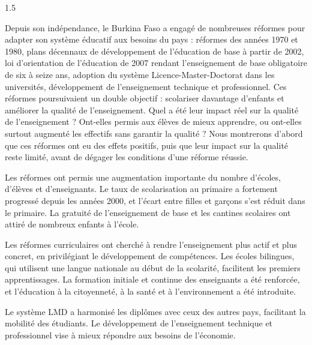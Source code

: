 \documentclass[12pt]{article}
\begin{document}
\begin{spacing}{1.5}


Depuis son indépendance, le Burkina Faso a engagé de nombreuses réformes pour adapter son système éducatif aux besoins du pays : réformes des années 1970 et 1980, plans décennaux de développement de l'éducation de base à partir de 2002, loi d'orientation de l'éducation de 2007 rendant l'enseignement de base obligatoire de six à seize ans, adoption du système Licence-Master-Doctorat dans les universités, développement de l'enseignement technique et professionnel. Ces réformes poursuivaient un double objectif : scolariser davantage d'enfants et améliorer la qualité de l'enseignement. Quel a été leur impact réel sur la qualité de l'enseignement ? Ont-elles permis aux élèves de mieux apprendre, ou ont-elles surtout augmenté les effectifs sans garantir la qualité ? Nous montrerons d'abord que ces réformes ont eu des effets positifs, puis que leur impact sur la qualité reste limité, avant de dégager les conditions d'une réforme réussie.


Les réformes ont permis une augmentation importante du nombre d'écoles, d'élèves et d'enseignants. Le taux de scolarisation au primaire a fortement progressé depuis les années 2000, et l'écart entre filles et garçons s'est réduit dans le primaire. La gratuité de l'enseignement de base et les cantines scolaires ont attiré de nombreux enfants à l'école.

Les réformes curriculaires ont cherché à rendre l'enseignement plus actif et plus concret, en privilégiant le développement de compétences. Les écoles bilingues, qui utilisent une langue nationale au début de la scolarité, facilitent les premiers apprentissages. La formation initiale et continue des enseignants a été renforcée, et l'éducation à la citoyenneté, à la santé et à l'environnement a été introduite.

Le système LMD a harmonisé les diplômes avec ceux des autres pays, facilitant la mobilité des étudiants. Le développement de l'enseignement technique et professionnel vise à mieux répondre aux besoins de l'économie.



\end{spacing}
\end{document}
